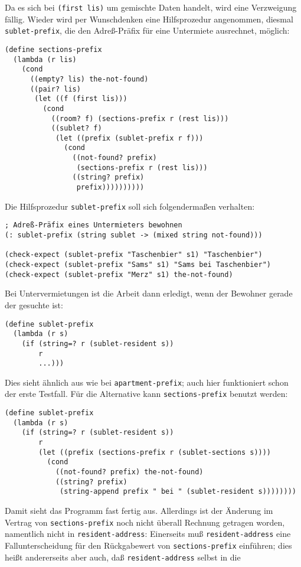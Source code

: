 %
Da es sich bei \texttt{(first lis)} um gemischte Daten handelt, wird
eine Verzweigung fällig.  Wieder wird per Wunschdenken eine
Hilfsprozedur angenommen, diesmal \texttt{sublet-prefix}, die den
Adreß-Präfix für eine Untermiete ausrechnet, möglich:
%
\begin{verbatim}
(define sections-prefix
  (lambda (r lis)
    (cond
      ((empty? lis) the-not-found)
      ((pair? lis)
       (let ((f (first lis)))
         (cond
           ((room? f) (sections-prefix r (rest lis)))
           ((sublet? f)
            (let ((prefix (sublet-prefix r f)))
              (cond
                ((not-found? prefix)
                 (sections-prefix r (rest lis)))
                ((string? prefix)
                 prefix))))))))))
\end{verbatim}
%
Die Hilfsprozedur \texttt{sublet-prefix} soll sich folgendermaßen verhalten:
%
\begin{verbatim}
; Adreß-Präfix eines Untermieters bewohnen
(: sublet-prefix (string sublet -> (mixed string not-found)))

(check-expect (sublet-prefix "Taschenbier" s1) "Taschenbier")
(check-expect (sublet-prefix "Sams" s1) "Sams bei Taschenbier")
(check-expect (sublet-prefix "Merz" s1) the-not-found)
\end{verbatim}
%
Bei Untervermietungen ist die Arbeit dann erledigt, wenn der Bewohner
gerade der gesuchte ist:
%
\begin{verbatim}
(define sublet-prefix
  (lambda (r s)
    (if (string=? r (sublet-resident s))
        r
        ...)))
\end{verbatim}
%
Dies sieht ähnlich aus wie bei \texttt{apartment-prefix}; auch hier
funktioniert schon der erste Testfall.  Für die Alternative kann
\texttt{sections-prefix} benutzt werden:
%
\begin{verbatim}
(define sublet-prefix
  (lambda (r s)
    (if (string=? r (sublet-resident s))
        r
        (let ((prefix (sections-prefix r (sublet-sections s))))
          (cond
            ((not-found? prefix) the-not-found)
            ((string? prefix)
             (string-append prefix " bei " (sublet-resident s))))))))
\end{verbatim}
%
Damit sieht das Programm fast fertig aus. Allerdings ist der Änderung
im Vertrag von \texttt{sections-prefix} noch nicht überall Rechnung
getragen worden, namentlich nicht in \texttt{resident-address}:
Einerseits muß \texttt{resident-address} eine Fallunterscheidung für
den Rückgabewert von \texttt{sections-prefix} einführen; dies heißt
andererseits aber auch, daß \texttt{resident-address} selbst in die
